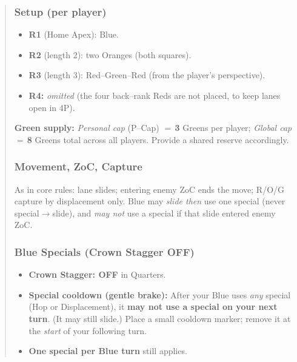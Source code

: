 \documentclass[11pt]{article}
\begin{document}
\begin{quote}
\subsubsection*{Setup (per player)}
\begin{itemize}[leftmargin=1.3em,itemsep=0.25em]
  \item \textbf{R1} (Home Apex): Blue.
  \item \textbf{R2} (length 2): two Oranges (both squares).
  \item \textbf{R3} (length 3): Red–Green–Red (from the player’s perspective).
  \item \textbf{R4:} \emph{omitted} (the four back–rank Reds are not placed, to keep lanes open in 4P).
\end{itemize}
\noindent\textbf{Green supply:} \emph{Personal cap} (P–Cap) $=\,$\textbf{3} Greens per player; \emph{Global cap} $=\,$\textbf{8} Greens total across all players. Provide a shared reserve accordingly.

\subsubsection*{Movement, ZoC, Capture}
\noindent As in core rules: lane slides; entering enemy ZoC ends the move; R/O/G capture by displacement only. Blue may \emph{slide then} use one special (never special$\rightarrow$slide), and \emph{may not} use a special if that slide entered enemy ZoC.

\subsubsection*{Blue Specials (Crown Stagger OFF)}
\begin{itemize}[leftmargin=1.3em,itemsep=0.25em]
  \item \textbf{Crown Stagger: OFF} in Quarters.
  \item \textbf{Special cooldown (gentle brake):} After your Blue uses \emph{any} special (Hop or Displacement), it \textbf{may not use a special on your next turn}. (It may still slide.) Place a small cooldown marker; remove it at the \emph{start} of your following turn.
  \item \textbf{One special per Blue turn} still applies.
\end{itemize}


\end{quote}
\end{document}
